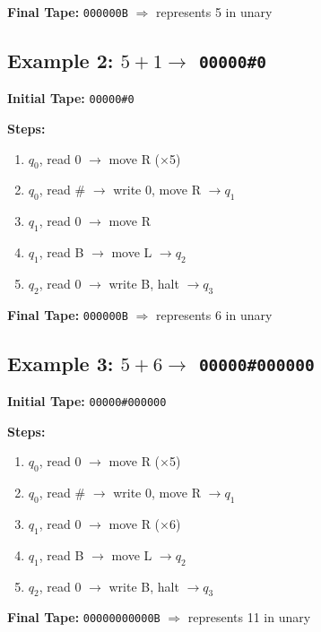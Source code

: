 \documentclass[12pt]{article}
\begin{document}
\textbf{Final Tape:} \texttt{000000B} $\Rightarrow$ represents 5 in unary

\subsection*{Example 2: $5 + 1 \rightarrow$ \texttt{00000\#0}}
\textbf{Initial Tape:} \texttt{00000\#0}

\textbf{Steps:}
\begin{enumerate}
    \item $q_0$, read 0 $\rightarrow$ move R (×5)
    \item $q_0$, read \# $\rightarrow$ write 0, move R $\rightarrow q_1$
    \item $q_1$, read 0 $\rightarrow$ move R
    \item $q_1$, read B $\rightarrow$ move L $\rightarrow q_2$
    \item $q_2$, read 0 $\rightarrow$ write B, halt $\rightarrow q_3$
\end{enumerate}

\textbf{Final Tape:} \texttt{000000B} $\Rightarrow$ represents 6 in unary

\subsection*{Example 3: $5 + 6 \rightarrow$ \texttt{00000\#000000}}
\textbf{Initial Tape:} \texttt{00000\#000000}

\textbf{Steps:}
\begin{enumerate}
    \item $q_0$, read 0 $\rightarrow$ move R (×5)
    \item $q_0$, read \# $\rightarrow$ write 0, move R $\rightarrow q_1$
    \item $q_1$, read 0 $\rightarrow$ move R (×6)
    \item $q_1$, read B $\rightarrow$ move L $\rightarrow q_2$
    \item $q_2$, read 0 $\rightarrow$ write B, halt $\rightarrow q_3$
\end{enumerate}

\textbf{Final Tape:} \texttt{00000000000B} $\Rightarrow$ represents 11 in unary
\end{document}
